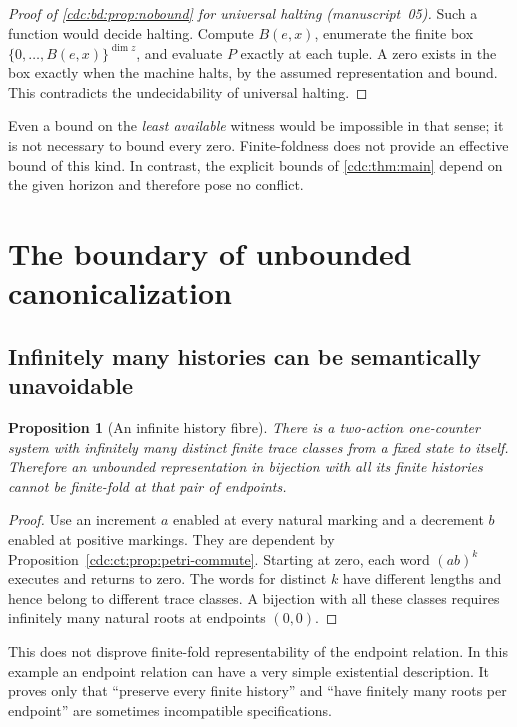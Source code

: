 \documentclass[11pt,a4paper]{article}
\newtheorem{proposition}[proposition]{Proposition}
\theoremstyle{definition}
\theoremstyle{remark}
\newcommand{\srctag}[1]{\texorpdfstring{\hspace{0.5em}{\normalfont\small\color{accent}[#1]}}{ [#1]}}
\begin{document}
\begin{proof}[Proof of \cref{cdc:bd:prop:nobound} for universal halting (manuscript~05)]
Such a function would decide halting. Compute $B(e,x)$, enumerate the finite box $\{0,\ldots,B(e,x)\}^{\dim z}$, and evaluate $P$ exactly at each tuple. A zero exists in the box exactly when the machine halts, by the assumed representation and bound. This contradicts the undecidability of universal halting.
\end{proof}

Even a bound on the \emph{least available} witness would be impossible in that sense; it is not necessary to bound every zero. Finite-foldness does not provide an effective bound of this kind. In contrast, the explicit bounds of \cref{cdc:thm:main} depend on the given horizon and therefore pose no conflict.


\section{The boundary of unbounded canonicalization\srctag{01}}\label{cdc:ct:sec:boundary}
\subsection{Infinitely many histories can be semantically unavoidable}
\begin{proposition}[An infinite history fibre]\label{cdc:ct:prop:infinite-histories}
There is a two-action one-counter system with infinitely many distinct finite trace classes from a fixed state to itself. Therefore an unbounded representation in bijection with \emph{all} its finite histories cannot be finite-fold at that pair of endpoints.
\end{proposition}
\begin{proof}
Use an increment $a$ enabled at every natural marking and a decrement $b$ enabled at positive markings. They are dependent by Proposition~\ref{cdc:ct:prop:petri-commute}. Starting at zero, each word $(ab)^k$ executes and returns to zero. The words for distinct $k$ have different lengths and hence belong to different trace classes. A bijection with all these classes requires infinitely many natural roots at endpoints $(0,0)$.
\end{proof}
This does not disprove finite-fold representability of the endpoint relation. In this example an endpoint relation can have a very simple existential description. It proves only that ``preserve every finite history'' and ``have finitely many roots per endpoint'' are sometimes incompatible specifications.
\end{document}
